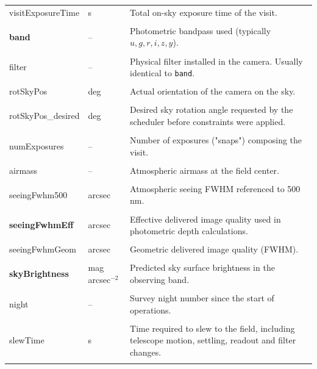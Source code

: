 \documentclass[english,10pt,a4paper]{article}
\begin{document}
\begin{longtable}{p{3.8cm}p{2cm}p{8.2cm}}
		visitExposureTime & s &
		Total on-sky exposure time of the visit. \\&&\\
		
		\textbf{band} & -- &
		Photometric bandpass used (typically $u,g,r,i,z,y$). \\&&\\
		
		filter & -- &
		Physical filter installed in the camera. Usually identical to \texttt{band}. \\&&\\
		
		rotSkyPos & deg &
		Actual orientation of the camera on the sky. \\&&\\
		
		rotSkyPos\_desired & deg &
		Desired sky rotation angle requested by the scheduler before constraints were applied. \\&&\\
		
		numExposures & -- &
		Number of exposures ("snaps") composing the visit. \\&&\\
		
		airmass & -- &
		Atmospheric airmass at the field center. \\&&\\
		
		seeingFwhm500 & arcsec &
		Atmospheric seeing FWHM referenced to 500 nm. \\&&\\
		
		\textbf{seeingFwhmEff} & arcsec &
		Effective delivered image quality used in photometric depth calculations. \\&&\\
		
		seeingFwhmGeom & arcsec &
		Geometric delivered image quality (FWHM). \\&&\\
		
		\textbf{skyBrightness} & mag arcsec$^{-2}$ &
		Predicted sky surface brightness in the observing band. \\&&\\
		
		night & -- &
		Survey night number since the start of operations. \\&&\\
		
		slewTime & s &
		Time required to slew to the field, including telescope motion, settling, readout and filter changes. \\&&\\
		

\end{longtable}
\end{document}
